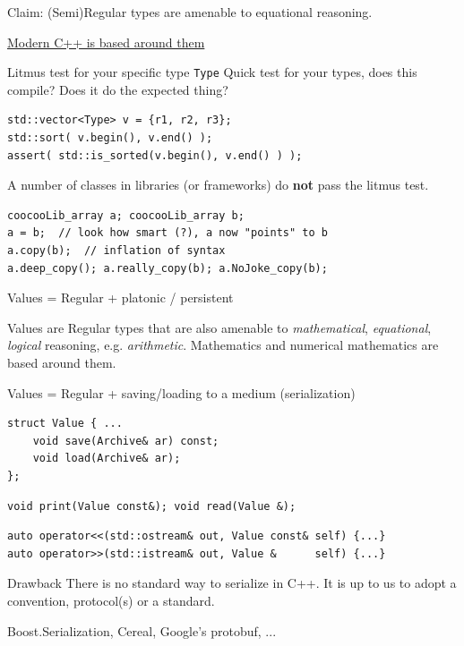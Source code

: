 \begin{frame}[fragile]{Claim: (Semi)Regular types are amenable to equational reasoning.}

	\underline{Modern C++ is based around them}

	\begin{alertblock}{Litmus test for your specific type \lstinline{Type}}
		Quick test for your types, does this compile? Does it do the expected thing?
\begin{lstlisting}
std::vector<Type> v = {r1, r2, r3};
std::sort( v.begin(), v.end() );
assert( std::is_sorted(v.begin(), v.end() ) );
\end{lstlisting}
\end{alertblock}

A number of classes in libraries (or frameworks) do \textbf{not} pass the litmus test.
\begin{lstlisting}
coocooLib_array a; coocooLib_array b;
a = b;  // look how smart (?), a now "points" to b
a.copy(b);  // inflation of syntax
a.deep_copy(); a.really_copy(b); a.NoJoke_copy(b);
\end{lstlisting}

\end{frame}

\begin{frame}[fragile]{Values = Regular + platonic / persistent}

Values are Regular types that are also amenable to \emph{mathematical}, \emph{equational}, \emph{logical} reasoning, e.g. \emph{arithmetic}.
Mathematics and numerical mathematics are based around them.

\pause

Values = Regular + saving/loading to a medium (serialization)

\begin{lstlisting}
struct Value { ...
	void save(Archive& ar) const;
	void load(Archive& ar);
};
\end{lstlisting}
	\begin{lstlisting}
void print(Value const&); void read(Value &);
\end{lstlisting}
	\begin{lstlisting}
auto operator<<(std::ostream& out, Value const& self) {...}
auto operator>>(std::istream& out, Value &      self) {...}
\end{lstlisting}

	\begin{alertblock}{Drawback}
		There is no standard way to serialize in C++.
		It is up to us to adopt a convention, protocol(s) or a standard.
	\end{alertblock}

	Boost.Serialization, Cereal, Google's protobuf, ...
\end{frame}

